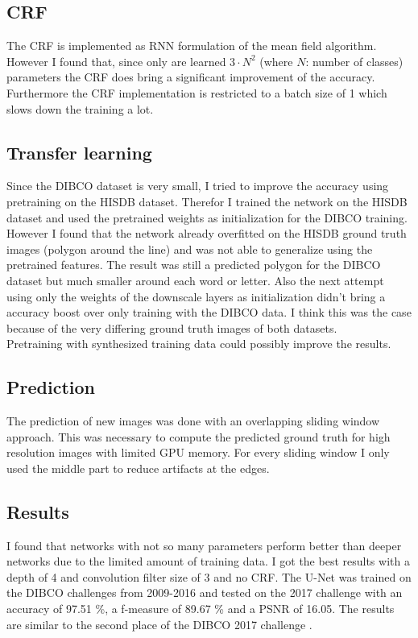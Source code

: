 \documentclass[a4paper, 9pt, twocolumn]{extarticle}
\begin{document}
\subsection*{CRF}

The CRF is implemented as RNN formulation of the mean field algorithm. However I
found that, since only are learned $3\cdot N^2$ (where $N$: number of classes)
parameters the CRF does bring a significant improvement of the accuracy.
Furthermore the CRF implementation is restricted to a batch size of 1 which
slows down the training a lot.

\subsection*{Transfer learning}

Since the DIBCO dataset is very small, I tried to improve the accuracy using
pretraining on the HISDB dataset. Therefor I trained the network on the HISDB
dataset and used the pretrained weights as initialization for the DIBCO
training. However I found that the network already overfitted on the HISDB
ground truth images (polygon around the line) and was not able to generalize
using the pretrained features. The result was still a predicted polygon for the
DIBCO dataset but much smaller around each word or letter. Also the next attempt
using only the weights of the downscale layers as initialization didn't bring a
accuracy boost over only training with the DIBCO data. I think this was the case
because of the very differing ground truth images of both datasets.\\
Pretraining with synthesized training data could possibly improve the results.

\subsection*{Prediction}

The prediction of new images was done with an overlapping sliding window
approach. This was necessary to compute the predicted ground truth for high
resolution images with limited GPU memory. For every sliding window I only used
the middle part to reduce artifacts at the edges.

\subsection*{Results}

I found that networks with not so many parameters perform better than deeper
networks due to the limited amount of training data. I got the best results with
a depth of 4 and convolution filter size of 3 and no CRF. The U-Net was trained
on the DIBCO challenges from 2009-2016 and tested on the 2017 challenge with an
accuracy of 97.51 \%, a f-measure of 89.67 \% and a PSNR of 16.05. The results
are similar to the second place of the DIBCO 2017 challenge
\cite{pratikakis2017icdar2017}.


\small

\end{document}
